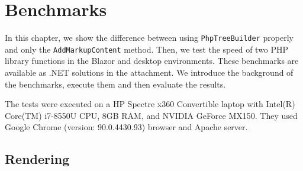 \chapter{Benchmarks}

In this chapter, we show the difference between using \texttt{PhpTreeBuilder} properly and only the \texttt{AddMarkupContent} method.
Then, we test the speed of two PHP library functions in the Blazor and desktop environments.
These benchmarks are available as .NET solutions in the attachment.
We introduce the background of the benchmarks, execute them and then evaluate the results.
\par
The tests were executed on a HP Spectre x360 Convertible laptop with Intel(R) Core(TM) i7-8550U CPU, 8GB RAM, and NVIDIA GeForce MX150.
They used Google Chrome (version: 90.0.4430.93) browser and Apache server.

\section{Rendering}

